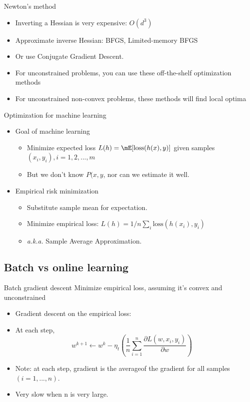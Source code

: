 \documentclass[notes]{beamer}
\begin{document}
\begin{frame}
	{Newton's method} 
	\begin{itemize}
		\item Inverting a Hessian is very expensive: $O(d^3)$ 
		\item Approximate inverse Hessian: BFGS, Limited-memory BFGS
		\item Or use Conjugate Gradient Descent.  
		\item For unconstrained problems, you can use these off-the-shelf optimization methods 
		\item For unconstrained non-convex problems, these methods  will find local optima 
	\end{itemize}
\end{frame}

\begin{frame}
	{Optimization for machine learning} 
	\begin{itemize}
		\item Goal of machine learning 
		\begin{itemize}
			\item Minimize expected loss $L(h) = \mE [ \mathrm{loss} (h(x),y )] $ given samples $(x_i,y_i ), i = 1,2,...,m $ 
			\item But we don't know $P(x,y$, nor can we estimate it well. 
			
		\end{itemize}
		\item Empirical risk minimization
		\begin{itemize}
			\item Substitute sample mean for expectation. 
			\item Minimize empirical loss: $L(h) = 1/n \sum_i \mathrm{loss} (h(x_i), y_i ) $ 
			\item \textit{a.k.a. } Sample Average Approximation. 
		\end{itemize}
	\end{itemize}
\end{frame}

\subsection{Batch vs online learning} 

\begin{frame}{Batch gradient descent} 
	Minimize empirical loss, assuming it's convex and unconstrained 
	\begin{itemize}
		\item Gradient descent on the empirical loss: 
		\item At each step, 
		$$w^{k+1} \leftarrow w^{k} - \eta_t 
		\left( \frac{1}{n} \sum_{i=1}^{n}
		 \frac{\partial L(w,x_i,y_i)}{\partial w} \right) $$
		\item Note: at each step, gradient is the averageof the gradient for all samples $(i=1,...,n)$. 
		\item Very slow when n  is very large. 
	\end{itemize}
	
\end{frame}
\end{document}
